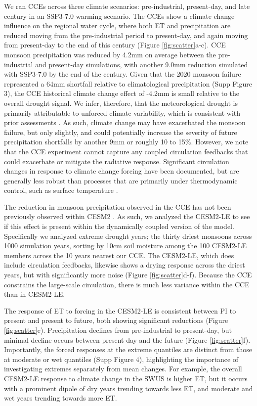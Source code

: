 \documentclass[draft]{agujournal2019}
\begin{document}
We ran CCEs across three climate scenarios: pre-industrial, present-day, and late century in an SSP3-7.0 warming scenario.
The CCEs show a climate change influence on the regional water cycle, where both ET and precipitation are reduced moving from the pre-industrial period to present-day, and again moving from present-day to the end of this century (Figure \ref{fig:scatter}a-c).
CCE monsoon precipitation was reduced by 4.2mm on average between the pre-industrial and present-day simulations, with another 9.0mm reduction simulated with SSP3-7.0 by the end of the century.
Given that the 2020 monsoon failure represented a 64mm shortfall relative to climatological precipitation (Supp Figure 3), the CCE historical climate change  effect of -4.2mm is small relative to the overall drought signal. We infer, therefore, that the meteorological drought is primarily attributable to unforced climate variability, which is consistent with prior assessments \cite{seager2022}.
As such, climate change may have exacerbated the monsoon failure, but only slightly, and could potentially increase the severity of future precipitation shortfalls by another 9mm or roughly 10 to 15\%. 
However, we note that the CCE experiment cannot capture any coupled circulation feedbacks that could exacerbate or mitigate the radiative response. 
Significant circulation changes in response to climate change forcing have been documented, but are generally less robust than processes that are primarily under thermodynamic control, such as surface temperature \cite{shepherd2014}.

The reduction in monsoon precipitation observed in the CCE has not been previously observed within CESM2 \cite{seager2022}.
As such, we analyzed the CESM2-LE to see if this effect is present within the dynamically coupled version of the model.
Specifically we analyzed extreme drought years; the thirty driest monsoons across 1000 simulation years, sorting by 10cm soil moisture among the 100 CESM2-LE members across the 10 years nearest our CCE.
The CESM2-LE, which does include circulation feedbacks, likewise shows a drying response across the driest years, but with significantly more noise (Figure \ref{fig:scatter}d-f).
Because the CCE constrains the large-scale circulation, there is much less variance within the CCE than in CESM2-LE. 

The response of ET to forcing in the CESM2-LE is consistent between PI to present and present to future, both showing significant reductions (Figure \ref{fig:scatter}e). 
Precipitation declines from pre-industrial to present-day, but minimal decline occurs between present-day and the future (Figure \ref{fig:scatter}f). 
Importantly, the forced responses at the extreme quantiles are distinct from those at moderate or wet quantiles (Supp Figure 4), highlighting the importance of investigating extremes separately from mean changes.
For example, the overall CESM2-LE response to climate change in the SWUS is higher ET, but it occurs with a prominent dipole of dry years trending towards less ET, and moderate and wet years trending towards more ET.
\end{document}

